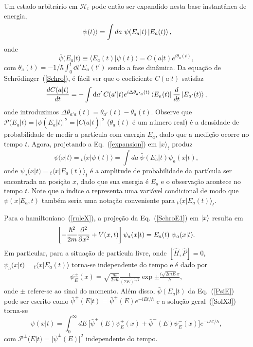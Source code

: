 Um estado arbitrário em ${\mathcal H}_t$ pode então ser expandido nesta base instantânea de energia,
\begin{equation}\label{expansion}
    \ket{\psi(t)}=\int da ~ {\bar \psi}(E_a|t) \ket{E_a(t)},
\end{equation}
onde
\begin{equation}\label{PsiE}
    {\bar \psi}(E_a|t) \equiv {\langle} E_a(t)|\psi(t)\rangle= C(a|t)e^{i \theta_a(t)},
\end{equation}
com $\theta_a(t)=-1/\hbar\int_0^t \dd{t'}E_a(t')$ sendo a fase dinâmica. Da equação de Schrödinger~(\ref{Schro}), é fácil ver que o coeficiente $C(a|t)$ satisfaz
\begin{equation}\label{Ca}
    \frac{dC(a|t)}{dt}=-\int \dd{a'} C(a'|t)e^{i\Delta \theta_{a'a}(t)}\bra{E_a(t)}\frac{d}{dt}\ket{E_{a'}(t)},
\end{equation}
onde introduzimos $\Delta \theta_{a'a}(t)=\theta_{a'}(t)- \theta_a (t)$. Observe que ${\mathcal P}(E_{a}|t)=|{\bar \psi}(E_{a}|t)|^2=|C(a|t)|^2$ ($\theta_{a}(t)$ é um número real) é a densidade de probabilidade de medir a partícula com energia $E_{a}$, dado que a medição ocorre no tempo $t$. Agora, projetando a Eq.~(\ref{expansion}) em $|x\rangle_t$ produz
\begin{equation}\label{SolX3}
\psi(x|t)={_t\langle} x|\psi(t)\rangle=\int da ~\bar{\psi} (E_a|t)  \psi_a(x|t),
\end{equation}
onde $\psi_a(x|t)={_t\langle} x|E_a(t)\rangle_t$ é a amplitude de probabilidade da partícula ser encontrada na posição $x$, dado que sua energia é $E_a$ e o observação acontece no tempo $t$. Note que o índice $a$ representa uma variável condicional de modo que $\psi(x|E_a,t)$ também seria uma notação conveniente para ${_t\langle} x|E_a(t)\rangle_t$.

Para o hamiltoniano~(\ref{ruleX}), a projeção da Eq.~(\ref{SchroE1}) em $ \ket{x}$ resulta em
\begin{equation}\label{SchroXE}
    \left[-\frac{\hbar^2}{2m}\pdv[2]{x}+V(x,t) \right]\psi_a(x|t)=E_a(t) ~\psi_a(x|t).
\end{equation}
Em particular, para a situação de partícula livre, onde $[{\hat{H}},\hat{P}]=0$, $\psi_a(x|t)={_t\langle} x|E_a(t) \rangle$ torna-se independente do tempo e é dado por
\begin{eqnarray}\label{SolXFree}
\psi_E^\pm(x)=\sqrt{\frac{m}{2\pi \hbar }}\frac{1}{(2E)^{1/2}}\exp{\pm \frac{ i\sqrt{2mE}x}{\hbar}},
\end{eqnarray}
onde $\pm$ refere-se ao sinal do momento. Além disso, ${\bar \psi}(E_a|t)$ da Eq.~(\ref{PsiE}) pode ser escrito como ${\bar \psi}^{\pm}(E|t)={\bar \psi}^{\pm}(E) e^{-iEt/\hbar}$ e a solução geral~(\ref{SolX3}) torna-se
\begin{equation}\label{SolXL}
    \psi(x|t)=\int_{0}^{\infty} dE ~ \big[{\bar \psi}^+(E) \psi_E^+(x)+{\bar \psi}^-(E)  \psi_E^-(x)\big]e^{-iEt/\hbar},
\end{equation}
com ${\mathcal P}^{\pm}(E|t)=|{\bar \psi}^{\pm}(E)|^2$ independente do tempo.








